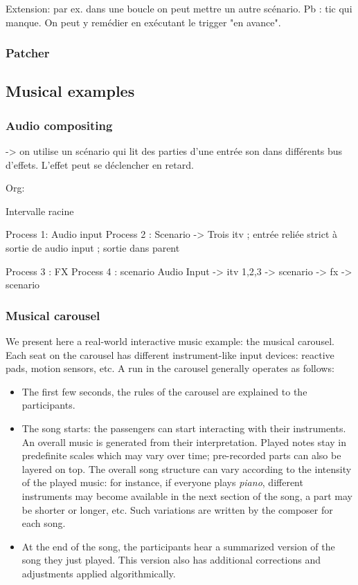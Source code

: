 \documentclass[applsci,article,submit,moreauthors,pdftex,10pt,a4paper]{mdpi}
\begin{document}
Extension: par ex. dans une boucle on peut mettre un autre scénario.
Pb : tic qui manque. On peut y remédier en exécutant le trigger "en avance".
\subsubsection{Patcher}


\subsection{Musical examples}
\subsubsection{Audio compositing}
-> on utilise un scénario qui lit des parties d'une entrée son dans différents bus d'effets. L'effet peut se déclencher en retard.

Org: 

Intervalle racine

Process 1:  Audio input
Process 2 : Scenario
  -> Trois itv ; entrée reliée strict à sortie de audio input ; sortie dans parent
  
Process 3 : FX
Process 4 : scenario
Audio Input -> itv {1,2,3} -> scenario -> fx -> scenario

\subsubsection{Musical carousel}
We present here a real-world interactive music example: the musical carousel.
Each seat on the carousel has different instrument-like input devices: reactive pads, motion sensors, etc.
A run in the carousel generally operates as follows: 

\begin{itemize}
    \item The first few seconds, the rules of the carousel are explained to the participants.
    \item The song starts: the passengers can start interacting with their instruments. An overall music is generated from their interpretation. Played notes stay in predefinite scales which may vary over time; pre-recorded parts can also be layered on top. The overall song structure can vary according to the intensity of the played music: for instance, if everyone plays \textit{piano}, different instruments may become available in the next section of the song, a part may be shorter or longer, etc. Such variations are written by the composer for each song.
    \item At the end of the song, the participants hear a summarized version of the song they just played. This version also has additional corrections and adjustments applied algorithmically.
\end{itemize}
\end{document}
